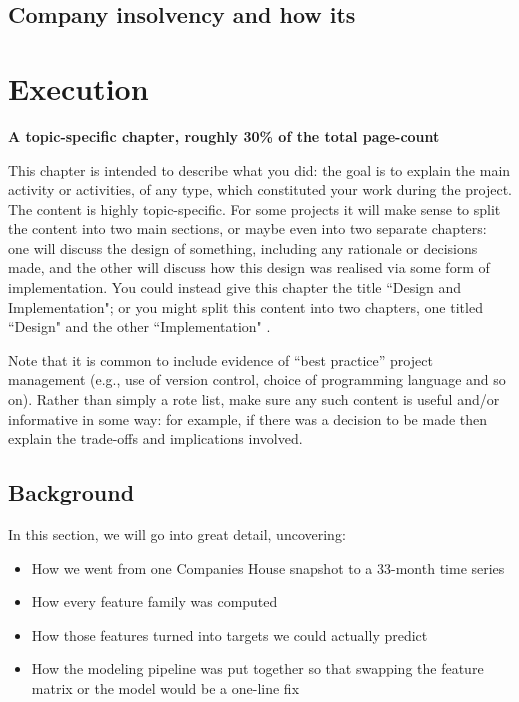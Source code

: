 \documentclass[ %
                    author={Daniel Page},
                supervisor={Dr. Andrew Calway},
                    degree={MSc},
                     title={Some Structural Guidelines for Data Science MSc Theses, Including Those With Long Titles that Run Across Multiple Lines on the Front Page},
                  subtitle={And those including an optional subtitle too, for good measure},
                      type={},
                      year={2021}]{dissertation}
\begin{document}
\section{Company insolvency and how its }

\chapter{Execution}
\label{chap:execution}

{\bf A topic-specific chapter, roughly 30\% of the total page-count}
\vspace{1cm} 

\noindent
This chapter is intended to describe what you did: the goal is to explain
the main activity or activities, of any type, which constituted your work 
during the project.  The content is highly topic-specific. For some 
projects it will make sense to split the content into two main sections, or maybe even into two separate chapters: one 
will discuss the design of something, including any rationale or decisions made, 
and the other will discuss how this design was realised via some form of 
implementation.  You could instead give this chapter the title ``Design and Implementation"; or you might split this content into two chapters, one titled ``Design" and the other ``Implementation" .

Note that it is common to include evidence of ``best practice'' project 
management (e.g., use of version control, choice of programming language 
and so on).  Rather than simply a rote list, make sure any such content 
is useful and/or informative in some way: for example, if there was a 
decision to be made then explain the trade-offs and implications 
involved.

\section{Background}
In this section, we will go into great detail, uncovering:
\begin{itemize}
    \item How we went from one Companies House snapshot to a 33-month time series
    \item How every feature family was computed
    \item How those features turned into targets we could actually predict
    \item How the modeling pipeline was put together so that swapping the feature matrix or the model would be a one-line fix
\end{itemize}
\end{document}
